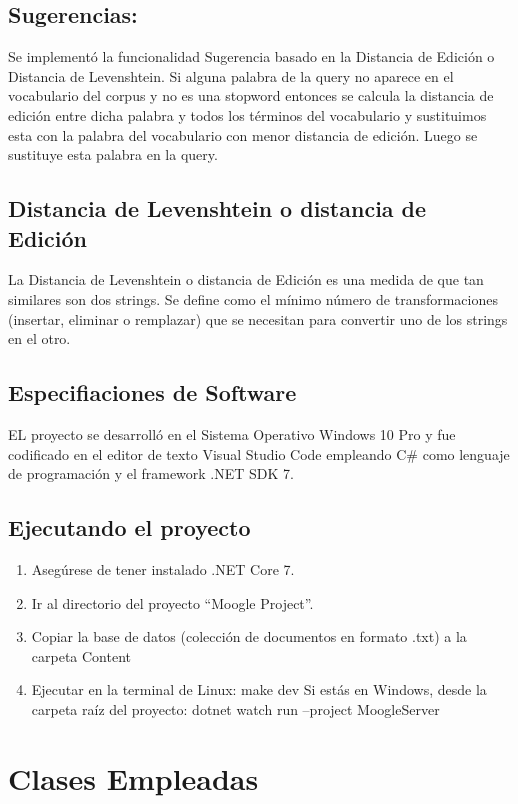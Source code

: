\documentclass[a4paper,12pt]{article}
\begin{document}
\subsection{Sugerencias:}
Se implementó la funcionalidad Sugerencia basado en la Distancia de Edición o Distancia de
Levenshtein. Si alguna palabra de la query no aparece en el vocabulario del corpus y no es una
stopword entonces se calcula la distancia de edición entre dicha palabra y todos los términos
del vocabulario y sustituimos esta con la palabra del vocabulario con menor distancia de edición.
Luego se sustituye esta palabra en la query.
\subsection{Distancia de Levenshtein o distancia de Edición}
La Distancia de Levenshtein o distancia de Edición es una medida de que tan similares son dos
strings. Se define como el mínimo número de transformaciones (insertar, eliminar o remplazar)
que se necesitan para convertir uno de los strings en el otro.

\subsection{Especifiaciones de Software}
EL proyecto se desarrolló en el Sistema Operativo Windows 10 Pro y fue codificado en el editor
de texto Visual Studio Code empleando C\# como lenguaje de programación y el framework
.NET SDK 7. 

\subsection{Ejecutando el proyecto}
\begin{enumerate}   
\item Asegúrese de tener instalado .NET Core 7.
\item Ir al directorio del proyecto “Moogle Project”.
\item Copiar la base de datos (colección de documentos en formato .txt) a la carpeta Content
\item Ejecutar en la terminal de Linux:
        make dev
    Si estás en Windows, desde la carpeta raíz del proyecto:
    dotnet watch run --project MoogleServer
\end{enumerate}


\section{Clases Empleadas}\label{sec: classes}
\end{document}
